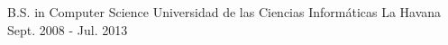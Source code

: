 


\begin{cventries}


\cventry
{B.S. in Computer Science} %
{Universidad de las Ciencias Informáticas} %
{La Havana} %
{Sept. 2008 - Jul. 2013} %
{ %
}


\end{cventries}

